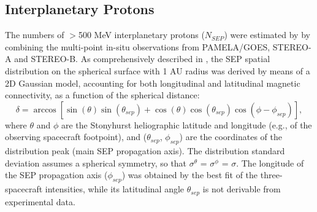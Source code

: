 \documentclass{aastex61}
\begin{document}
\subsection{Interplanetary Protons}\label{Interplanetary Protons}
The numbers of $>$500 MeV interplanetary protons ($N_{SEP}$) were estimated by \citet{ref:DENOLFO2019} by combining the 
multi-point in-situ observations from PAMELA/GOES, STEREO-A and STEREO-B.
As comprehensively described in \citet{ref:BRUNORICHARDSON2021}, the SEP spatial distribution on the spherical surface with 1 AU radius was derived by means of a 2D Gaussian model, accounting for both longitudinal and latitudinal magnetic connectivity, as a function of the spherical distance:
\begin{equation}\label{eq:great-circle}
\delta = \arccos\left[ \sin(\theta)\sin(\theta_{sep}) + \cos(\theta)\cos(\theta_{sep})\cos(\phi-\phi_{sep})\right],
\end{equation}
where $\theta$ and $\phi$ are the Stonyhurst heliographic latitude and longitude (e.g., of the observing spacecraft footpoint), and ($\theta_{sep}$, $\phi_{sep}$) are the coordinates of the distribution peak (main SEP propagation axis). The distribution standard deviation assumes a spherical symmetry, so that $\sigma^{\theta}$ = $\sigma^{\phi}$ = $\sigma$. The longitude of the SEP propagation axis ($\phi_{sep}$) was obtained by the best fit of the three-spacecraft intensities, while its latitudinal angle $\theta_{sep}$ is not derivable from experimental data. 
\end{document}
